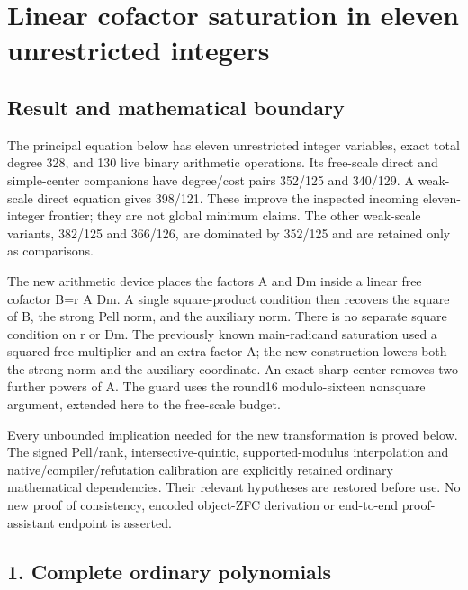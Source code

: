 \section{Linear cofactor saturation in eleven unrestricted integers}



\subsection{Result and mathematical boundary}



The principal equation below has eleven unrestricted integer variables, exact total degree 328, and 130 live binary arithmetic operations. Its free-scale direct and simple-center companions have degree/\allowbreak{}cost pairs 352/\allowbreak{}125 and 340/\allowbreak{}129. A weak-scale direct equation gives 398/\allowbreak{}121. These improve the inspected incoming eleven-integer frontier; they are not global minimum claims. The other weak-scale variants, 382/\allowbreak{}125 and 366/\allowbreak{}126, are dominated by 352/\allowbreak{}125 and are retained only as comparisons.



The new arithmetic device places the factors A and Dm inside a linear free cofactor B=\allowbreak{}r A Dm. A single square-product condition then recovers the square of B, the strong Pell norm, and the auxiliary norm. There is no separate square condition on r or Dm. The previously known main-radicand saturation used a squared free multiplier and an extra factor A; the new construction lowers both the strong norm and the auxiliary coordinate. An exact sharp center removes two further powers of A. The guard uses the round16 modulo-sixteen nonsquare argument, extended here to the free-scale budget.



Every unbounded implication needed for the new transformation is proved below. The signed Pell/\allowbreak{}rank, intersective-quintic, supported-modulus interpolation and native/\allowbreak{}compiler/\allowbreak{}refutation calibration are explicitly retained ordinary mathematical dependencies. Their relevant hypotheses are restored before use. No new proof of consistency, encoded object-ZFC derivation or end-to-end proof-assistant endpoint is asserted.



\subsection{1. Complete ordinary polynomials}



